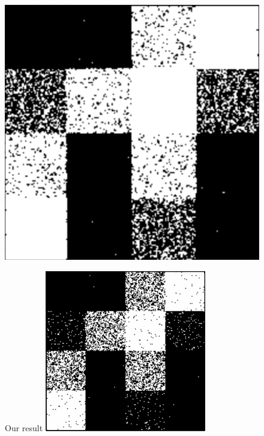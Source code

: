 \documentclass[11pt]{article}
\begin{document}
\begin{figure}[!htb]
\begin{center}
\begin{multicols}{3}
	\includegraphics[height = \linewidth]{squares0}\par
    Our result
	\includegraphics[height = \linewidth]{squares1}\par

\end{multicols}
\end{center}
\end{figure}
\end{document}
